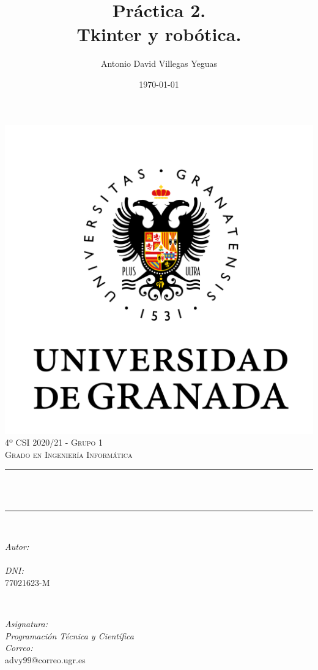 \documentclass[12pt, spanish]{article}
\title{Práctica 2.\\
Tkinter y robótica.\hspace{0.05cm} }
\author{Antonio David Villegas Yeguas}
\date{\today}
\makeatletter
\let\thetitle\@title
\let\theauthor\@author
\makeatother
\begin{document}

\begin{titlepage}
    \centering
    \vspace*{0.3 cm}
    \includegraphics[scale = 0.50]{ugr.png}\\[0.7 cm]
    \textsc{\large 4º CSI 2020/21 - Grupo 1}\\[0.5 cm]
    \textsc{\large Grado en Ingeniería Informática}\\[0.5 cm]
    \rule{\linewidth}{0.2 mm} \\[0.2 cm]
    { \huge \bfseries \thetitle}\\
    \rule{\linewidth}{0.2 mm} \\[1 cm]

    \begin{minipage}{0.4\textwidth}
        \begin{flushleft} \large
            \emph{Autor:}\\
            \theauthor\\
			 \emph{DNI:}\\
            77021623-M
            \end{flushleft}
            \end{minipage}~
            \begin{minipage}{0.4\textwidth}
            \begin{flushright} \large
            \emph{Asignatura: \\
            Programación Técnica y Científica}   \\
            \emph{Correo:}\\
            advy99@correo.ugr.es
        \end{flushright}
    \end{minipage}\\[0.5cm]


\end{titlepage}
\end{document}
